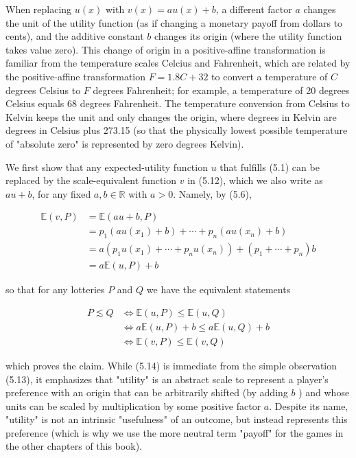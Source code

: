 \documentclass[12pt]{article}
\begin{document}
When replacing $u(x)$ with $v(x)=a u(x)+b$, a different factor $a$ changes the unit of the utility function (as if changing a monetary payoff from dollars to cents), and the additive constant $b$ changes its origin (where the utility function takes value zero). This change of origin in a positive-affine transformation is familiar from the temperature scales Celcius and Fahrenheit, which are related by the positive-affine transformation $F=1.8 C+32$ to convert a temperature of $C$ degrees Celsius to $F$ degrees Fahrenheit; for example, a temperature of 20 degrees Celsius equals 68 degrees Fahrenheit. The temperature conversion from Celsius to Kelvin keeps the unit and only changes the origin, where degrees in Kelvin are degrees in Celsius plus 273.15 (so that the physically lowest possible temperature of "absolute zero" is represented by zero degrees Kelvin).

We first show that any expected-utility function $u$ that fulfills (5.1) can be replaced by the scale-equivalent function $v$ in (5.12), which we also write as $a u+b$, for any fixed $a, b \in \mathbb{R}$ with $a>0$. Namely, by (5.6),


\begin{align*}
\mathbb{E}(v, P) & =\mathbb{E}(a u+b, P) \\
& =p_{1}\left(a u\left(x_{1}\right)+b\right)+\cdots+p_{n}\left(a u\left(x_{n}\right)+b\right) \\
& =a\left(p_{1} u\left(x_{1}\right)+\cdots+p_{n} u\left(x_{n}\right)\right)+\left(p_{1}+\cdots+p_{n}\right) b \\
& =a \mathbb{E}(u, P)+b \tag{5.13}
\end{align*}


so that for any lotteries $P$ and $Q$ we have the equivalent statements


\begin{align*}
P \lesssim Q & \Leftrightarrow \mathbb{E}(u, P) \leq \mathbb{E}(u, Q) \\
& \Leftrightarrow a \mathbb{E}(u, P)+b \leq a \mathbb{E}(u, Q)+b \\
& \Leftrightarrow \mathbb{E}(v, P) \leq \mathbb{E}(v, Q) \tag{5.14}
\end{align*}


which proves the claim. While (5.14) is immediate from the simple observation (5.13), it emphasizes that "utility" is an abstract scale to represent a player's preference with an origin that can be arbitrarily shifted (by adding $b$ ) and whose units can be scaled by multiplication by some positive factor $a$. Despite its name, "utility" is not an intrinsic "usefulness" of an outcome, but instead represents this preference (which is why we use the more neutral term "payoff" for the games in the other chapters of this book).
\end{document}
